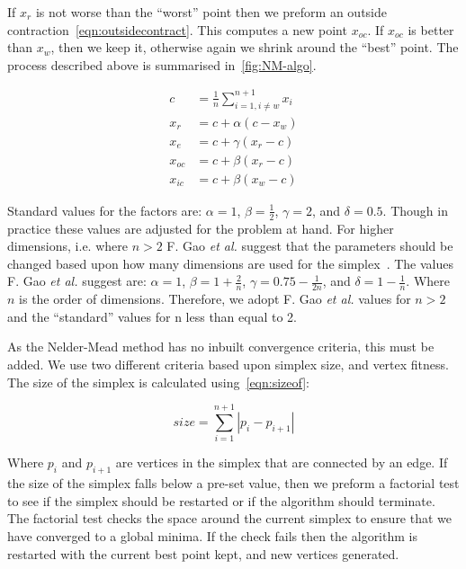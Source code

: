 If $x_r$ is not worse than the ``worst'' point then we preform an outside contraction~\cref{eqn:outsidecontract}.
This computes a new point $x_{oc}$.
If $x_{oc}$ is better than $x_w$, then we keep it, otherwise again we shrink around the ``best'' point.
The process described above is summarised in~\cref{fig:NM-algo}.

\begin{align}
c &= \frac{1}{n}\sum \limits_{i=1,i\neq w}^{n+1} x_i \label{eqn:centroid}\\
x_r &= c + \alpha(c - x_w)\label{eqn:reflect}\\
x_e &= c + \gamma(x_r - c)\label{eqn:expand}\\
x_{oc} &= c + \beta(x_r - c)\label{eqn:outsidecontract}\\
x_{ic} &= c + \beta(x_w - c)\label{eqn:insidecontract}
\end{align}

Standard values for the factors are: $\alpha=1$, $\beta=\frac{1}{2}$, $\gamma=2$, and $\delta=0.5$.
Though in practice these values are adjusted for the problem at hand.
For higher dimensions, i.e. where $n > 2$ F. Gao \textit{et al.} suggest that the parameters should be changed based upon how many dimensions are used for the simplex~\cite{gao2012implementing}.
The values F. Gao \textit{et al.} suggest are: $\alpha=1$, $\beta=1+\tfrac{2}{n}$, $\gamma=0.75-\tfrac{1}{2n}$, and $\delta=1-\tfrac{1}{n}$.
Where $n$ is the order of dimensions.
Therefore, we adopt F. Gao \textit{et al.} values for $n>2$ and the ``standard'' values for n less than equal to 2.

As the Nelder-Mead method has no inbuilt convergence criteria, this must be added.
We use two different criteria based upon simplex size, and vertex fitness.
The size of the simplex is calculated using~\cref{eqn:sizeof}:

\begin{equation}
size=\sum\limits_{i=1}^{n+1}|p_{i}-p_{i+1}|
\label{eqn:sizeof}
\end{equation}

Where $p_i$ and $p_{i+1}$ are vertices in the simplex that are connected by an edge. 
If the size of the simplex falls below a pre-set value, then we preform a factorial test to see if the simplex should be restarted or if the algorithm should terminate.
The factorial test checks the space around the current simplex to ensure that we have converged to a global minima.
If the check fails then the algorithm is restarted with the current best point kept, and new vertices generated.

